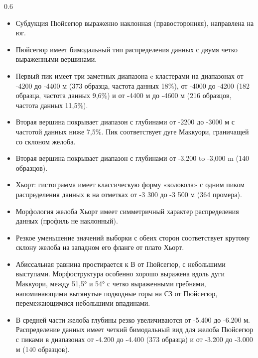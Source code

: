 \documentclass[pdflatex,compress,8pt,
	xcolor={dvipsnames,dvipsnames,svgnames,x11names,table},
	hyperref={colorlinks = true,breaklinks = true, urlcolor = NavyBlue}]{beamer}
\begin{document}
\begin{frame}
\begin{minipage}[0.4\textheight]{\textwidth}
\begin{columns}[T]
\begin{column}{0.6\textwidth}
\begin{itemize}\scriptsize
            \item Субдукция Пюйсегюр выраженно наклонная (правосторонняя), направлена ​​на юг.
            \item Пюйсегюр имеет бимодальный тип распределения данных с двумя четко выраженными вершинами. 
            \item Первый пик имеет три заметных диапазона c кластерами на диапазонах от -4200 до -4400 м (373 образца, частота данных 18\%), от -4000 до -4200 (182 образца, частота данных 9,6\%) и от -4400 м до -4600 м (216 образцов, частота данных 11,5\%).
            \item Вторая вершина покрывает диапазон с глубинами от -2200 до -3000 м с частотой данных ниже 7,5\%. Пик соответствует дуге Маккуори, граничащей со склоном желоба.
            \item Вторая вершина покрывает диапазон с глубинами от -3,200 to -3,000 m (140 образцов). 
            \item Хьорт: гистограмма имеет классическую форму «колокола» с одним пиком распределения данных в на отметках от -3 300 до -3 500 м (364 промера).
            \item Морфология желоба Хьорт имеет симметричный характер распределения данных (профиль не наклонный).
            \item Резкое уменьшение значений выборки с обеих сторон соответствует крутому склону желоба на западном его фланге от плато Хьорт. 
            \item Абиссальная равнина простирается к В от Пюйсегюр, с небольшими выступами. Морфоструктура особенно хорошо выражена вдоль дуги Маккуори, между 51,5° и 54° с четко выраженными гребнями, напоминающими вытянутые подводные горы на СЗ от Пюйсегюр, перемежающимися небольшими впадинами. 
            \item В средней части желоба глубины резко увеличиваются от -5.400 до -6.200 м. Распределение данных имеет четкий бимодальный вид для желоба Пюйсегюр с пиками в диапазонах от -4.200 до -4.400 (373 образца) и от -3.200 до -3.000 м (140 образцов).
\end{itemize}	
\end{column}
\end{columns}
\end{minipage}
\end{frame}
\end{document}
